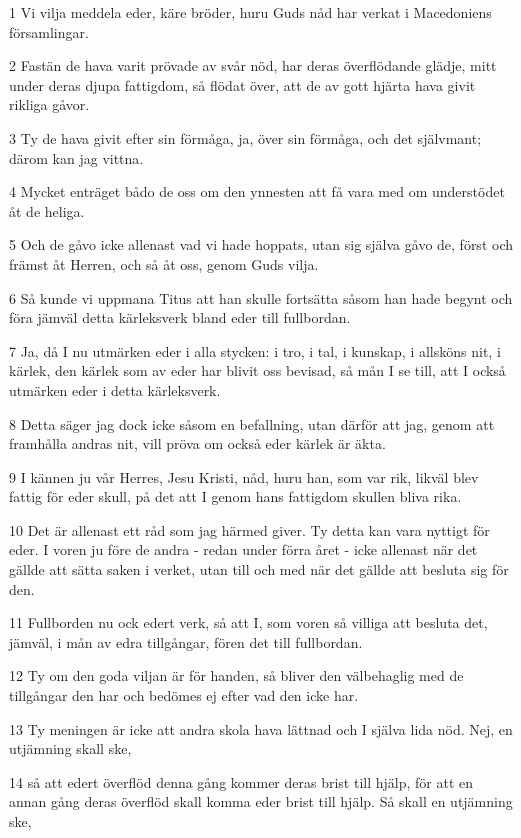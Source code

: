 \par 1 Vi vilja meddela eder, käre bröder, huru Guds nåd har verkat i Macedoniens församlingar.
\par 2 Fastän de hava varit prövade av svår nöd, har deras överflödande glädje, mitt under deras djupa fattigdom, så flödat över, att de av gott hjärta hava givit rikliga gåvor.
\par 3 Ty de hava givit efter sin förmåga, ja, över sin förmåga, och det självmant; därom kan jag vittna.
\par 4 Mycket enträget bådo de oss om den ynnesten att få vara med om understödet åt de heliga.
\par 5 Och de gåvo icke allenast vad vi hade hoppats, utan sig själva gåvo de, först och främst åt Herren, och så åt oss, genom Guds vilja.
\par 6 Så kunde vi uppmana Titus att han skulle fortsätta såsom han hade begynt och föra jämväl detta kärleksverk bland eder till fullbordan.
\par 7 Ja, då I nu utmärken eder i alla stycken: i tro, i tal, i kunskap, i allsköns nit, i kärlek, den kärlek som av eder har blivit oss bevisad, så mån I se till, att I också utmärken eder i detta kärleksverk.
\par 8 Detta säger jag dock icke såsom en befallning, utan därför att jag, genom att framhålla andras nit, vill pröva om också eder kärlek är äkta.
\par 9 I kännen ju vår Herres, Jesu Kristi, nåd, huru han, som var rik, likväl blev fattig för eder skull, på det att I genom hans fattigdom skullen bliva rika.
\par 10 Det är allenast ett råd som jag härmed giver. Ty detta kan vara nyttigt för eder. I voren ju före de andra - redan under förra året - icke allenast när det gällde att sätta saken i verket, utan till och med när det gällde att besluta sig för den.
\par 11 Fullborden nu ock edert verk, så att I, som voren så villiga att besluta det, jämväl, i mån av edra tillgångar, fören det till fullbordan.
\par 12 Ty om den goda viljan är för handen, så bliver den välbehaglig med de tillgångar den har och bedömes ej efter vad den icke har.
\par 13 Ty meningen är icke att andra skola hava lättnad och I själva lida nöd. Nej, en utjämning skall ske,
\par 14 så att edert överflöd denna gång kommer deras brist till hjälp, för att en annan gång deras överflöd skall komma eder brist till hjälp. Så skall en utjämning ske,
